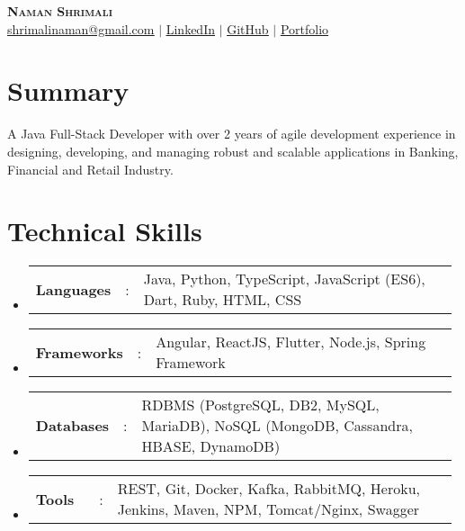 \documentclass[a4paper,10pt]{article}
\newcommand{\link}[2]{\textcolor{blue!70!white}{\uline{\href{#1}{#2}}}}
\newcommand{\resumeSectionType}[3]{
  \item\begin{tabular*}{0.96\textwidth}[t]{
    p{0.15\linewidth}p{0.02\linewidth}p{0.81\linewidth}
  }
    \textbf{#1} & #2 & #3
  \end{tabular*}\vspace{-2pt}
}
\newcommand{\resumeHeadingListStart}{
  \begin{itemize}[leftmargin=0.15in, label={}]
}
\newcommand{\resumeHeadingListEnd}{\end{itemize}}
\begin{document}
\justifying


\begin{center}
  \textbf{\Huge \scshape Naman Shrimali} \\ \vspace{1pt}
  \link{mailto:shrimalinaman@gmail.com}{shrimalinaman@gmail.com}
  $|$
  \link{https://www.linkedin.com/in/namanshrimali/}{LinkedIn}
  $|$
  \link{https://github.com/namanshrimali}{GitHub}
  $|$
  \link{https://namanshrimali.com}{Portfolio}
\end{center}



\section{Summary}
\small{
  A Java Full-Stack Developer with over 2 years of agile development experience in designing, developing, and managing robust and scalable applications in Banking, Financial and Retail Industry. }

\vspace{-0.8\baselineskip}


\section{Technical Skills}
  \resumeHeadingListStart{}
    \resumeSectionType{Languages}{:}{Java, Python, TypeScript, JavaScript (ES6), Dart, Ruby, HTML, CSS}
    \resumeSectionType{Frameworks}{:}{Angular, ReactJS, Flutter, Node.js, Spring Framework}
    \resumeSectionType{Databases}{:}{RDBMS (PostgreSQL, DB2, MySQL, MariaDB), NoSQL (MongoDB, Cassandra, HBASE, DynamoDB)}
    \resumeSectionType{Tools}{:}{REST, Git, Docker, Kafka, RabbitMQ, Heroku, Jenkins, Maven, NPM, Tomcat/Nginx, Swagger}
  \resumeHeadingListEnd{}

\vspace{-0.8\baselineskip}


\end{document}
